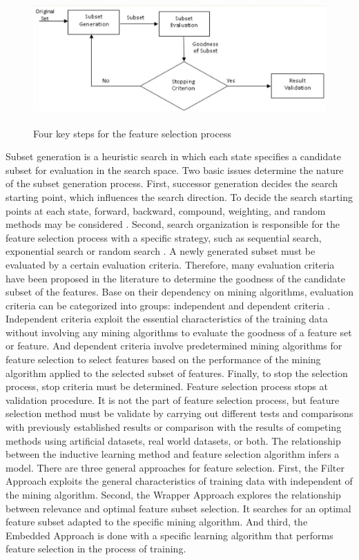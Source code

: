 \documentclass[document.tex]{subfiles}
\begin{document}
\begin{figure}[H]
	\begin{center}
		\includegraphics[height=5.0cm]{imgs/Feature_mining.png}
	\end{center}
	\caption{Four key steps for the feature selection process}
	\label{fig:Four key steps for the feature selection process}
\end{figure}
\noindent Subset generation is a heuristic search in which each state specifies a candidate subset
for evaluation in the search space. Two basic issues determine the nature of the subset
generation process. First, successor generation decides the search starting point, which
influences the search direction. To decide the search starting points at each state, forward,
backward, compound, weighting, and random methods may be considered . Second,
search organization is responsible for the feature selection process with a specific strategy,
such as sequential search, exponential search or random search . A newly generated subset
must be evaluated by a certain evaluation criteria. Therefore, many evaluation criteria
have been proposed in the literature to determine the goodness of the candidate subset
of the features. Base on their dependency on mining algorithms, evaluation criteria can
be categorized into groups: independent and dependent criteria . Independent criteria
exploit the essential characteristics of the training data without involving any mining
algorithms to evaluate the goodness of a feature set or feature. And dependent criteria
involve predetermined mining algorithms for feature selection to select features based
on the performance of the mining algorithm applied to the selected subset of features.
Finally, to stop the selection process, stop criteria must be determined. Feature selection
process stops at validation procedure. It is not the part of feature selection process, but
feature selection method must be validate by carrying out different tests and comparisons
with previously established results or comparison with the results of competing methods
using artificial datasets, real world datasets, or both.
The relationship between the inductive learning method and feature selection algorithm
infers a model. There are three general approaches for feature selection. First, the Filter
Approach exploits the general characteristics of training data with independent of the
mining algorithm. Second, the Wrapper Approach explores the relationship between
relevance and optimal feature subset selection\cite{12}. It searches for an optimal feature subset
adapted to the specific mining algorithm. And third, the Embedded Approach is
done with a specific learning algorithm that performs feature selection in the process of
training.
\end{document}
